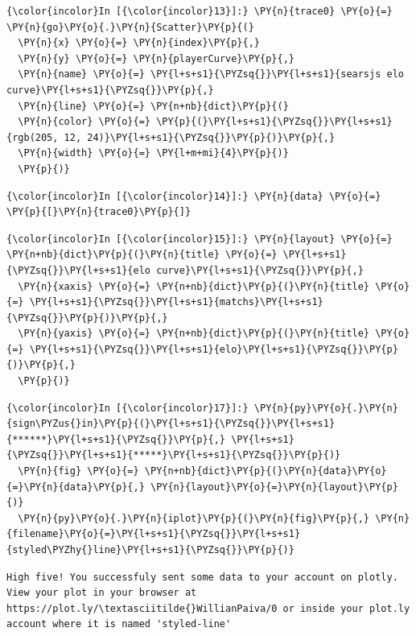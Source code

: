 \begin{Verbatim}[commandchars=\\\{\}]
  {\color{incolor}In [{\color{incolor}13}]:} \PY{n}{trace0} \PY{o}{=} \PY{n}{go}\PY{o}{.}\PY{n}{Scatter}\PY{p}{(}
  \PY{n}{x} \PY{o}{=} \PY{n}{index}\PY{p}{,}
  \PY{n}{y} \PY{o}{=} \PY{n}{playerCurve}\PY{p}{,}
  \PY{n}{name} \PY{o}{=} \PY{l+s+s1}{\PYZsq{}}\PY{l+s+s1}{searsjs elo curve}\PY{l+s+s1}{\PYZsq{}}\PY{p}{,}
  \PY{n}{line} \PY{o}{=} \PY{n+nb}{dict}\PY{p}{(}
  \PY{n}{color} \PY{o}{=} \PY{p}{(}\PY{l+s+s1}{\PYZsq{}}\PY{l+s+s1}{rgb(205, 12, 24)}\PY{l+s+s1}{\PYZsq{}}\PY{p}{)}\PY{p}{,}
  \PY{n}{width} \PY{o}{=} \PY{l+m+mi}{4}\PY{p}{)}
  \PY{p}{)}
\end{Verbatim}

\begin{Verbatim}[commandchars=\\\{\}]
  {\color{incolor}In [{\color{incolor}14}]:} \PY{n}{data} \PY{o}{=} \PY{p}{[}\PY{n}{trace0}\PY{p}{]}
\end{Verbatim}

\begin{Verbatim}[commandchars=\\\{\}]
  {\color{incolor}In [{\color{incolor}15}]:} \PY{n}{layout} \PY{o}{=} \PY{n+nb}{dict}\PY{p}{(}\PY{n}{title} \PY{o}{=} \PY{l+s+s1}{\PYZsq{}}\PY{l+s+s1}{elo curve}\PY{l+s+s1}{\PYZsq{}}\PY{p}{,}
  \PY{n}{xaxis} \PY{o}{=} \PY{n+nb}{dict}\PY{p}{(}\PY{n}{title} \PY{o}{=} \PY{l+s+s1}{\PYZsq{}}\PY{l+s+s1}{matchs}\PY{l+s+s1}{\PYZsq{}}\PY{p}{)}\PY{p}{,}
  \PY{n}{yaxis} \PY{o}{=} \PY{n+nb}{dict}\PY{p}{(}\PY{n}{title} \PY{o}{=} \PY{l+s+s1}{\PYZsq{}}\PY{l+s+s1}{elo}\PY{l+s+s1}{\PYZsq{}}\PY{p}{)}\PY{p}{,}
  \PY{p}{)}
\end{Verbatim}

\begin{Verbatim}[commandchars=\\\{\}]
  {\color{incolor}In [{\color{incolor}17}]:} \PY{n}{py}\PY{o}{.}\PY{n}{sign\PYZus{}in}\PY{p}{(}\PY{l+s+s1}{\PYZsq{}}\PY{l+s+s1}{******}\PY{l+s+s1}{\PYZsq{}}\PY{p}{,} \PY{l+s+s1}{\PYZsq{}}\PY{l+s+s1}{*****}\PY{l+s+s1}{\PYZsq{}}\PY{p}{)}
  \PY{n}{fig} \PY{o}{=} \PY{n+nb}{dict}\PY{p}{(}\PY{n}{data}\PY{o}{=}\PY{n}{data}\PY{p}{,} \PY{n}{layout}\PY{o}{=}\PY{n}{layout}\PY{p}{)}
  \PY{n}{py}\PY{o}{.}\PY{n}{iplot}\PY{p}{(}\PY{n}{fig}\PY{p}{,} \PY{n}{filename}\PY{o}{=}\PY{l+s+s1}{\PYZsq{}}\PY{l+s+s1}{styled\PYZhy{}line}\PY{l+s+s1}{\PYZsq{}}\PY{p}{)}
\end{Verbatim}

\begin{Verbatim}[commandchars=\\\{\}]
  High five! You successfuly sent some data to your account on plotly. View your plot in your browser at https://plot.ly/\textasciitilde{}WillianPaiva/0 or inside your plot.ly account where it is named 'styled-line'
\end{Verbatim}

